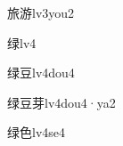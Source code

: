 \begin{verbete}[10;12]{旅游}{lv3you2}
\end{verbete}

\begin{verbete}[11]{绿}{lv4}
\end{verbete}

\begin{verbete}[11;7]{绿豆}{lv4dou4}
\end{verbete}

\begin{verbete}[11;7;7]{绿豆芽}{lv4dou4·ya2}
\end{verbete}

\begin{verbete}[11;6]{绿色}{lv4se4}
\end{verbete}


